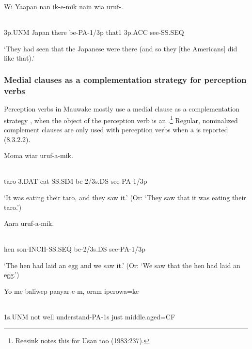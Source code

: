 \ea%
\label{ex:x1499}
\gll Wi  Yaapan  nan  ik-e-mik  nain  wia  uruf-.  \\
      \\
\glt
\z

3p.UNM  Japan  there  be-PA-1/3p  that1  3p.ACC  see-SS.SEQ

`They had seen that the Japanese were there (and so they [the Americans] did like that).'

\subsubsection[Medial clauses as a complementation strategy for perception verbs]{Medial clauses as a complementation strategy for perception verbs}
\hypertarget{RefHeading23241935131865}{}
Perception verbs in Mauwake mostly use a medial clause as a complementation strategy \citep[371]{Dixon2010}, when the object of the perception verb is an .\footnote{Reesink notes this for Usan too (1983:237).} Regular, nominalized complement clauses are only used with perception verbs when a  is reported (8.3.2.2).

\ea%
\label{ex:x1509}
\gll Moma  wiar    uruf-a-mik. \\
      \\
\glt
\z

taro  3.DAT  eat-SS.SIM-be-2/3s.DS  see-PA-1/3p

`It was eating their taro, and they saw it.' (Or: `They saw that it was eating their taro.')

\ea%
\label{ex:x1510}
\gll Aara  \textstyleEmphasizedVernacularWords{-}  uruf-a-mik. \\
      \\
\glt
\z

hen  son-INCH-SS.SEQ  be-2/3s.DS  see-PA-1/3p

`The hen had laid an egg and we saw it.' (Or: `We saw that the hen had laid an egg.')

\ea%
\label{ex:x1511}
\gll Yo  me  baliwep  paayar-e-m,  oram  iperowa=ke \\
      \\
\glt
\z

1s.UNM  not  well  understand-PA-1s  just  middle.aged=CF

